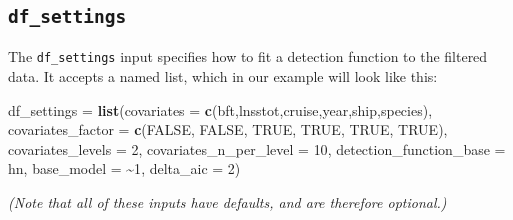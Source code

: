 \documentclass[
]{book}
\newenvironment{Shaded}{\begin{snugshade}}{\end{snugshade}}
\newcommand{\AttributeTok}[1]{\textcolor[rgb]{0.13,0.29,0.53}{#1}}
\newcommand{\ConstantTok}[1]{\textcolor[rgb]{0.56,0.35,0.01}{#1}}
\newcommand{\DecValTok}[1]{\textcolor[rgb]{0.00,0.00,0.81}{#1}}
\newcommand{\FunctionTok}[1]{\textcolor[rgb]{0.13,0.29,0.53}{\textbf{#1}}}
\newcommand{\NormalTok}[1]{#1}
\newcommand{\OtherTok}[1]{\textcolor[rgb]{0.56,0.35,0.01}{#1}}
\newcommand{\StringTok}[1]{\textcolor[rgb]{0.31,0.60,0.02}{#1}}
\begin{document}
~

\hypertarget{df_settings}{%
\subsection*{\texorpdfstring{\texttt{df\_settings}}{df\_settings}}\label{df_settings}}

The \texttt{df\_settings} input specifies how to fit a detection function to the filtered data. It accepts a named list, which in our example will look like this:

\begin{Shaded}
\begin{Highlighting}[]
\NormalTok{df\_settings }\OtherTok{=} \FunctionTok{list}\NormalTok{(}\AttributeTok{covariates =} \FunctionTok{c}\NormalTok{(}\StringTok{\textquotesingle{}bft\textquotesingle{}}\NormalTok{,}\StringTok{\textquotesingle{}lnsstot\textquotesingle{}}\NormalTok{,}\StringTok{\textquotesingle{}cruise\textquotesingle{}}\NormalTok{,}\StringTok{\textquotesingle{}year\textquotesingle{}}\NormalTok{,}\StringTok{\textquotesingle{}ship\textquotesingle{}}\NormalTok{,}\StringTok{\textquotesingle{}species\textquotesingle{}}\NormalTok{),}
                   \AttributeTok{covariates\_factor =} \FunctionTok{c}\NormalTok{(}\ConstantTok{FALSE}\NormalTok{, }\ConstantTok{FALSE}\NormalTok{, }\ConstantTok{TRUE}\NormalTok{, }\ConstantTok{TRUE}\NormalTok{, }\ConstantTok{TRUE}\NormalTok{, }\ConstantTok{TRUE}\NormalTok{),}
                   \AttributeTok{covariates\_levels =} \DecValTok{2}\NormalTok{,}
                   \AttributeTok{covariates\_n\_per\_level =} \DecValTok{10}\NormalTok{,}
                   \AttributeTok{detection\_function\_base =} \StringTok{\textquotesingle{}hn\textquotesingle{}}\NormalTok{,}
                   \AttributeTok{base\_model =} \StringTok{\textquotesingle{}\textasciitilde{}1\textquotesingle{}}\NormalTok{,}
                   \AttributeTok{delta\_aic =} \DecValTok{2}\NormalTok{)}
\end{Highlighting}
\end{Shaded}

\emph{(Note that all of these inputs have defaults, and are therefore optional.)}
\end{document}
